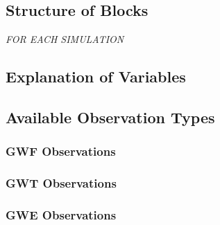 

\subsection{Structure of Blocks}
\vspace{5mm}

\noindent \textit{FOR EACH SIMULATION}



\subsection{Explanation of Variables}
\begin{description}

\end{description}


\subsection{Available Observation Types}

\subsubsection{GWF Observations}


\subsubsection{GWT Observations}


\subsubsection{GWE Observations}


% 
